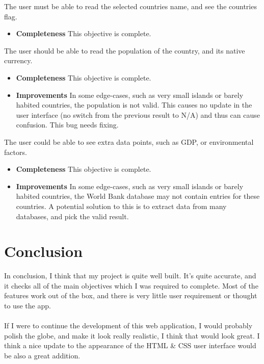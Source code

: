 \begin{enumerate}
        The user must be able to read the selected countries name, and see the countries flag.
        \begin{itemize}
            \item \textbf{Completeness}
                This objective is complete.
        \end{itemize}
        The user should be able to read the population of the country, and its native currency.
        \begin{itemize}
            \item \textbf{Completeness}
                This objective is complete.
            \item \textbf{Improvements}
                In some edge-cases, such as very small islands or barely habited countries, the population is not valid. This causes no update in the user interface (no switch from the previous result to N/A) and thus can cause confusion. This bug needs fixing.
        \end{itemize}
        The user could be able to see extra data points, such as GDP, or environmental factors.
        \begin{itemize}
            \item \textbf{Completeness}
                This objective is complete.
            \item \textbf{Improvements}
                In some edge-cases, such as very small islands or barely habited countries, the World Bank database may not contain entries for these countries. A potential solution to this is to extract data from many databases, and pick the valid result.
        \end{itemize}
\end{enumerate}

\section{Conclusion}
In conclusion, I think that my project is quite well built. It's quite accurate, and it checks all of the main objectives which I was required to complete. Most of the features work out of the box, and there is very little user requirement or thought to use the app. \\ \\
If I were to continue the development of this web application, I would probably polish the globe, and make it look really realistic, I think that would look great. I think a nice update to the appearance of the HTML \& CSS user interface would be also a great addition.

